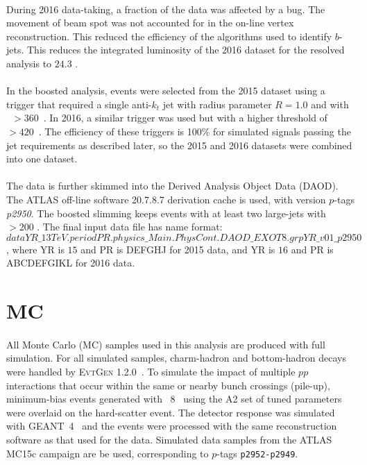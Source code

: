 \paragraph{}
During 2016 data-taking, a fraction of the data was affected by a bug.
The movement of beam spot was not accounted for in the on-line vertex reconstruction.
This reduced the efficiency of the algorithms used to identify $b$-jets. 
This reduces the integrated luminosity of the 2016 dataset for the resolved analysis to $24.3$ \ifb.

\paragraph{}
In the boosted analysis, events were selected from the 2015 dataset using a trigger that required a single anti-$k_t$ jet with radius parameter $R=1.0$ and with \pt~$>360$~\GeV. In 2016, a similar trigger was used but with a higher threshold of \pt~$>420$~\GeV. The efficiency of these triggers is 100\% for simulated signals passing the jet requirements as described later, so the 2015 and 2016 datasets were combined into one dataset. 

\paragraph{}
The data is further skimmed into the Derived Analysis Object Data (DAOD). The ATLAS off-line software 20.7.8.7 derivation cache is used, with version $p$-tags \textit{p2950}. The boosted slimming keeps events with at least two large-\R jets with \pt~$>200$ \GeV. The final input data file has name format: $dataYR\_13TeV.periodPR.physics\_Main.PhysCont.DAOD\_EXOT8.grpYR\_v01\_p2950$, where YR is $15$ and PR is DEFGHJ for 2015 data, and YR is $16$ and PR is ABCDEFGIKL for 2016 data.


\section{MC}
\paragraph{}
All Monte Carlo (MC) samples used in this analysis are produced with full simulation.
For all simulated samples, charm-hadron and bottom-hadron decays were handled by {\textsc{EvtGen}} 1.2.0~\cite{EvtGen}. 
To simulate the impact of multiple $pp$ interactions that occur within the same or nearby bunch crossings (pile-up), minimum-bias events generated with \pythia~8~\cite{Sjostrand:2006za} using the A2 set of tuned parameters~\cite{MC12AU2} were overlaid on the hard-scatter event. 
The detector response was simulated with GEANT~4~\cite{Agostinelli:2002hh, Aad:2010ah} and the events were processed with the same reconstruction software as that used for the data.  
Simulated data samples from the ATLAS MC15c campaign are be used, corresponding to $p$-tags \texttt{p2952-p2949}.

